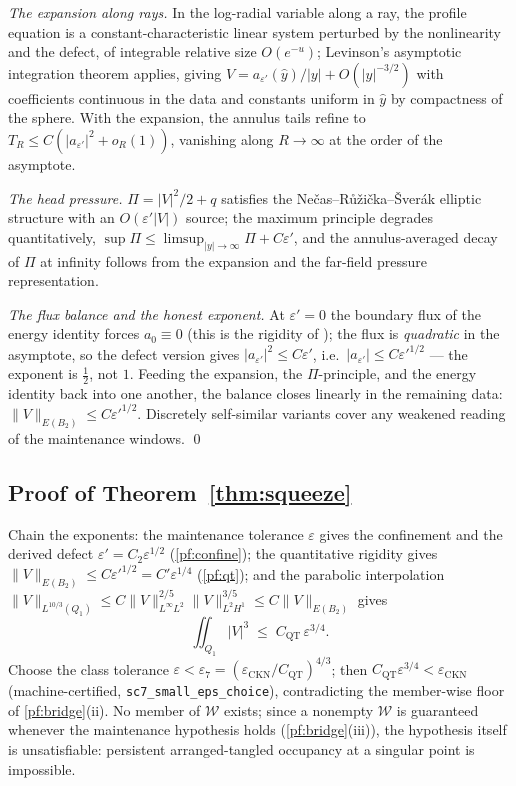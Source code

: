\documentclass[11pt,letterpaper]{amsart}
\theoremstyle{definition}
\theoremstyle{remark}
\newcommand{\norm}[1]{\lVert #1 \rVert}
\newcommand{\abs}[1]{\lvert #1 \rvert}
\begin{document}
\emph{The expansion along rays.} In the log-radial variable along a ray, the profile
equation is a constant-characteristic linear system perturbed by the nonlinearity and
the defect, of integrable relative size $O(e^{-u})$; Levinson's asymptotic
integration theorem \cite{CoddingtonLevinson1955} applies, giving
$V=a_{\varepsilon'}(\hat y)/\abs{y}+O(\abs{y}^{-3/2})$ with coefficients continuous
in the data and constants uniform in $\hat y$ by compactness of the sphere. With the
expansion, the annulus tails refine to $T_R\le C(\abs{a_{\varepsilon'}}^2+o_R(1))$,
vanishing along $R\to\infty$ at the order of the asymptote.

\emph{The head pressure.} $\Pi=\abs{V}^2/2+q$ satisfies the
Ne\v{c}as--R\r{u}\v{z}i\v{c}ka--\v{S}ver\'ak elliptic structure with an
$O(\varepsilon'\abs{V})$ source; the maximum principle degrades quantitatively,
$\sup\Pi\le\limsup_{\abs{y}\to\infty}\Pi+C\varepsilon'$, and the annulus-averaged
decay of $\Pi$ at infinity follows from the expansion and the far-field pressure
representation.

\emph{The flux balance and the honest exponent.} At $\varepsilon'=0$ the boundary
flux of the energy identity forces $a_0\equiv0$ (this is the rigidity of
\cite{NRS1996,Tsai1998}); the flux is \emph{quadratic} in the asymptote, so the
defect version gives $\abs{a_{\varepsilon'}}^2\le C\varepsilon'$, i.e.\
$\abs{a_{\varepsilon'}}\le C\varepsilon'^{1/2}$ --- the exponent is $\tfrac12$, not
$1$. Feeding the expansion, the $\Pi$-principle, and the energy identity back into
one another, the balance closes linearly in the remaining data:
$\norm{V}_{E(B_2)}\le C\varepsilon'^{1/2}$. Discretely self-similar variants
\cite{Tsai2014,ChaeWolf2017} cover any weakened reading of the maintenance windows.
\qed

\subsection{Proof of Theorem~\ref{thm:squeeze}}\label{pf:squeeze}
Chain the exponents: the maintenance tolerance $\varepsilon$ gives the confinement
and the derived defect $\varepsilon'=C_2\varepsilon^{1/2}$ (\cref{pf:confine}); the
quantitative rigidity gives $\norm{V}_{E(B_2)}\le C\varepsilon'^{1/2}
=C'\varepsilon^{1/4}$ (\cref{pf:qt}); and the parabolic interpolation
$\norm{V}_{L^{10/3}(Q_1)}\le C\norm{V}_{L^\infty L^2}^{2/5}\norm{V}_{L^2H^1}^{3/5}
\le C\norm{V}_{E(B_2)}$ gives
\[
\iint_{Q_1}\abs{V}^3\;\le\;C_{\mathrm{QT}}\,\varepsilon^{3/4}.
\]
Choose the class tolerance $\varepsilon<\varepsilon_7=
(\varepsilon_{\mathrm{CKN}}/C_{\mathrm{QT}})^{4/3}$; then
$C_{\mathrm{QT}}\varepsilon^{3/4}<\varepsilon_{\mathrm{CKN}}$ (machine-certified,
\texttt{sc7\_small\_eps\_choice}), contradicting the member-wise floor of
\cref{pf:bridge}(ii). No member of $\mathcal{W}$ exists; since a nonempty
$\mathcal{W}$ is guaranteed whenever the maintenance hypothesis holds
(\cref{pf:bridge}(iii)), the hypothesis itself is unsatisfiable: persistent
arranged-tangled occupancy at a singular point is impossible.
\end{document}
